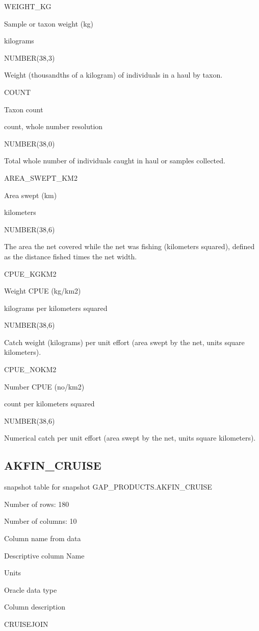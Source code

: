 \documentclass[
  letterpaper,
  oneside,
  open=any]{scrbook}
\begin{document}
WEIGHT\_KG

Sample or taxon weight (kg)

kilograms

NUMBER(38,3)

Weight (thousandths of a kilogram) of individuals in a haul by taxon.

COUNT

Taxon count

count, whole number resolution

NUMBER(38,0)

Total whole number of individuals caught in haul or samples collected.

AREA\_SWEPT\_KM2

Area swept (km)

kilometers

NUMBER(38,6)

The area the net covered while the net was fishing (kilometers squared),
defined as the distance fished times the net width.

CPUE\_KGKM2

Weight CPUE (kg/km2)

kilograms per kilometers squared

NUMBER(38,6)

Catch weight (kilograms) per unit effort (area swept by the net, units
square kilometers).

CPUE\_NOKM2

Number CPUE (no/km2)

count per kilometers squared

NUMBER(38,6)

Numerical catch per unit effort (area swept by the net, units square
kilometers).

\subsection{AKFIN\_CRUISE}\label{akfin_cruise}

snapshot table for snapshot GAP\_PRODUCTS.AKFIN\_CRUISE

Number of rows: 180

Number of columns: 10

Column name from data

Descriptive column Name

Units

Oracle data type

Column description

CRUISEJOIN
\end{document}
